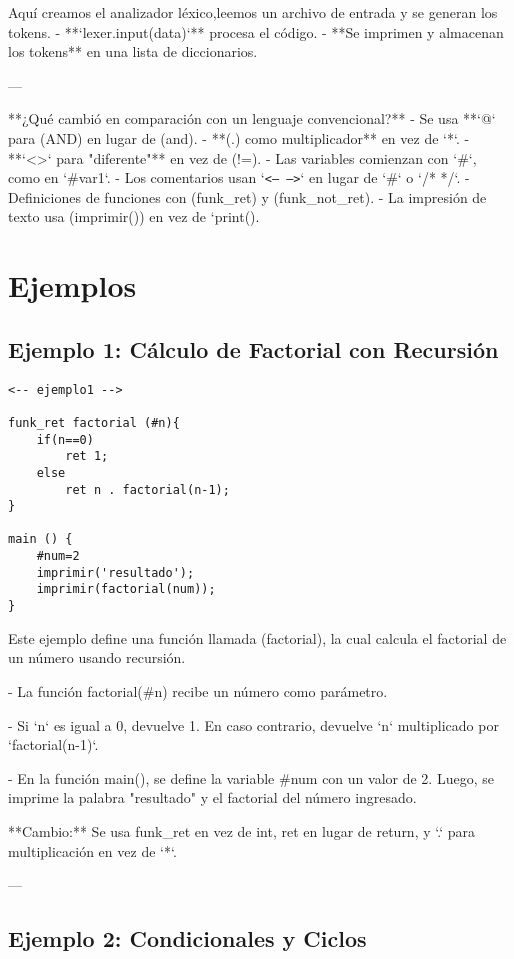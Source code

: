 \documentclass{article}
\begin{document}
Aquí creamos el analizador léxico,leemos un archivo de entrada y se generan los tokens.  
- **`lexer.input(data)`** procesa el código.  
- **Se imprimen y almacenan los tokens** en una lista de diccionarios.  

---

**¿Qué cambió en comparación con un lenguaje convencional?**  
- Se usa **`@` para (AND) en lugar de (and).  
- **(.) como multiplicador** en vez de `*`.  
- **`\textless{}\textgreater{}` para "diferente"** en vez de (!=).  
- Las variables comienzan con `\#`, como en `\#var1`.  
- Los comentarios usan `\texttt{\textless{}-- --\textgreater{}}` en lugar de `#` o `/* */`.  
- Definiciones de funciones con (funk_ret) y (funk_not_ret).  
- La impresión de texto usa (imprimir()) en vez de `print().  


\section{Ejemplos}

\subsection{Ejemplo 1: Cálculo de Factorial con Recursión}

\begin{verbatim}
<-- ejemplo1 -->

funk_ret factorial (#n){
    if(n==0)
        ret 1;
    else
        ret n . factorial(n-1);
}

main () {
    #num=2
    imprimir('resultado');
    imprimir(factorial(num));
}
\end{verbatim}

Este ejemplo define una función llamada (factorial), la cual calcula el factorial de un número usando recursión.  

- La función factorial(#n) recibe un número como parámetro.  

- Si `n` es igual a 0, devuelve 1. En caso contrario, devuelve `n` multiplicado por `factorial(n-1)`.  

- En la función main(), se define la variable #num con un valor de 2. Luego, se imprime la palabra "resultado" y el factorial del número ingresado.  

**Cambio:** Se usa funk_ret en vez de int, ret en lugar de return, y `.` para multiplicación en vez de `*`.  

---

\subsection{Ejemplo 2: Condicionales y Ciclos}
\end{document}

